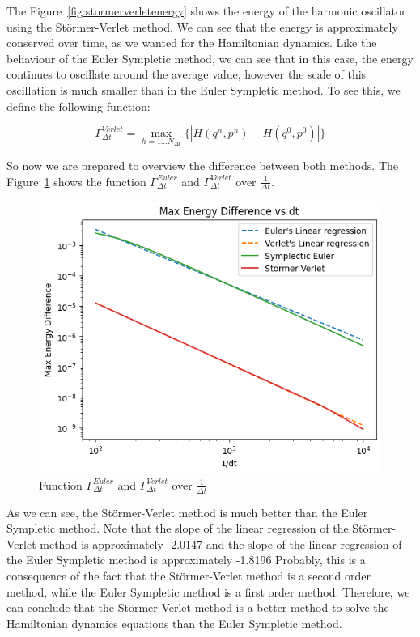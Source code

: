 \documentclass{article}
\begin{document}
The Figure~\ref{fig:stormerverletenergy} shows the energy of the harmonic oscillator using the Störmer-Verlet method. We can see that the energy is approximately conserved over time, as we wanted for the Hamiltonian dynamics. Like the behaviour of the Euler Sympletic method, we can see that in this case, the energy continues to oscillate around the average value, however the scale of this oscillation is much smaller than in the Euler Sympletic method. To see this, we define the following function:

\[
	\Gamma_{\Delta t}^{Verlet} = \max_{h = 1 ... N_{\Delta t}}\{|H(q^n, p^n) - H(q^0, p^0)|\}
\]

So now we are prepared to overview the difference between both methods. The Figure~\ref*{fig:comparisonmaxenergy} shows the function \(\Gamma_{\Delta t}^{Euler}\) and \(\Gamma_{\Delta t}^{Verlet}\) over \(\frac{1}{\Delta t}\).

\begin{figure}[H]
	\centering
	\includegraphics[width=0.5\linewidth]{./Figures/Sympletic/maxenergydifference.png}
	\caption{Function \(\Gamma_{\Delta t}^{Euler}\) and \(\Gamma_{\Delta t}^{Verlet}\) over \(\frac{1}{\Delta t}\)}
	\label{fig:comparisonmaxenergy}
\end{figure}

As we can see, the Störmer-Verlet method is much better than the Euler Sympletic method. Note that the slope of the linear regression of the Störmer-Verlet method is approximately -2.0147 and the slope of the linear regression of the Euler Sympletic method is approximately -1.8196 Probably, this is a consequence of the fact that the Störmer-Verlet method is a second order method, while the Euler Sympletic method is a first order method. Therefore, we can conclude that the Störmer-Verlet method is a better method to solve the Hamiltonian dynamics equations than the Euler Sympletic method.

\label{sec:linear_stability_verlet}
\end{document}
